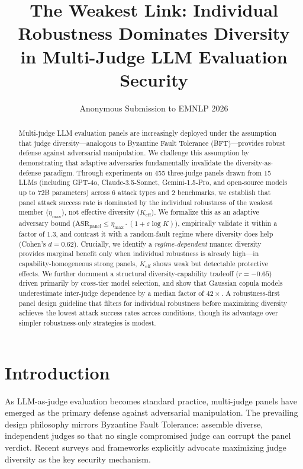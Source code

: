 \documentclass[11pt,a4paper]{article}
\title{The Weakest Link: Individual Robustness Dominates Diversity\\in Multi-Judge LLM Evaluation Security}
\author{Anonymous Submission to EMNLP 2026}
\date{}
\begin{document}
\maketitle

\begin{abstract}
Multi-judge LLM evaluation panels are increasingly deployed under the assumption that judge diversity---analogous to Byzantine Fault Tolerance (BFT)---provides robust defense against adversarial manipulation.
We challenge this assumption by demonstrating that adaptive adversaries fundamentally invalidate the diversity-as-defense paradigm.
Through experiments on 455 three-judge panels drawn from 15 LLMs (including GPT-4o, Claude-3.5-Sonnet, Gemini-1.5-Pro, and open-source models up to 72B parameters) across 6 attack types and 2 benchmarks, we establish that panel attack success rate is dominated by the individual robustness of the weakest member ($\eta_{\max}$), not effective diversity ($K_{\text{eff}}$).
We formalize this as an adaptive adversary bound ($\text{ASR}_{\text{panel}} \leq \eta_{\max} \cdot (1 + \varepsilon \log K)$), empirically validate it within a factor of 1.3, and contrast it with a random-fault regime where diversity does help (Cohen's $d = 0.62$).
Crucially, we identify a \emph{regime-dependent} nuance: diversity provides marginal benefit only when individual robustness is already high---in capability-homogeneous strong panels, $K_{\text{eff}}$ shows weak but detectable protective effects.
We further document a structural diversity-capability tradeoff ($r = -0.65$) driven primarily by cross-tier model selection, and show that Gaussian copula models underestimate inter-judge dependence by a median factor of $42\times$.
A robustness-first panel design guideline that filters for individual robustness before maximizing diversity achieves the lowest attack success rates across conditions, though its advantage over simpler robustness-only strategies is modest.
\end{abstract}

\section{Introduction}

As LLM-as-judge evaluation becomes standard practice, multi-judge panels have emerged as the primary defense against adversarial manipulation. The prevailing design philosophy mirrors Byzantine Fault Tolerance: assemble diverse, independent judges so that no single compromised judge can corrupt the panel verdict. Recent surveys and frameworks explicitly advocate maximizing judge diversity as the key security mechanism.
\end{document}
